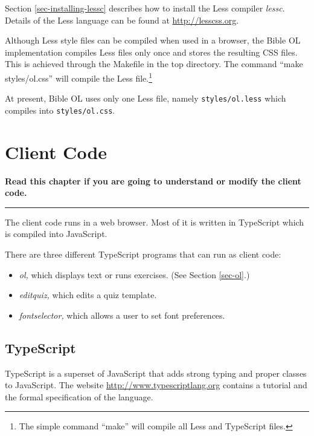 \documentclass[11pt,oneside,a4paper]{memoir}
\begin{document}
\lstset{frame=tb} %


Section \ref{sec-installing-lessc} describes how to install the Less compiler
\emph{lessc}. Details of the Less language can be found at \url{http://lesscss.org}.

Although Less style files can be compiled when used in a browser, the Bible OL implementation
compiles Less files only once and stores the resulting CSS files. This is achieved through the
Makefile in the top directory. The command ``make styles/ol.css'' will compile the Less
file.\footnote{The simple command ``make'' will compile all Less and TypeScript files.}

At present, Bible OL uses only one Less file, namely \texttt{styles/ol.less} which compiles into
\texttt{styles/ol.css}.

\chapter{Client Code}\label{chap-client-code}

\textbf{Read this chapter if you are going to understand or modify the client code.}
\plainbreak{3}

The client code runs in a web browser. Most of it is written in TypeScript which is compiled into
JavaScript.

There are three different TypeScript programs that can run as client code:


\begin{itemize}
\item \emph{ol,} which displays text or runs exercises. (See Section \ref{sec-ol}.)
\item \emph{editquiz,} which edits a quiz template.
\item \emph{fontselector,} which allows a user to set font preferences.
\end{itemize}

\section{TypeScript}\label{sec-typescript-use}

TypeScript is a superset of JavaScript that adds strong typing and proper classes to JavaScript.
The website \url{http://www.typescriptlang.org} contains a tutorial and the formal specification of
the language.
\end{document}
